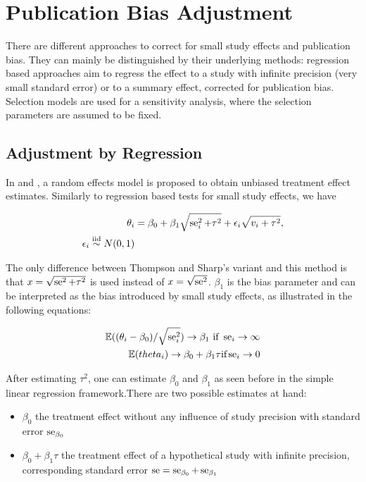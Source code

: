 \documentclass[11pt,a4paper,twoside]{book}\usepackage[]{graphicx}\usepackage[]{color}
\begin{document}
\section{Publication Bias Adjustment}
There are different approaches to correct for small study effects and publication bias. They can mainly be distinguished by their underlying methods: regression based approaches aim to regress the effect to a study with infinite precision (\ie very small standard error) or to a summary effect, corrected for publication bias. Selection models are used for a sensitivity analysis, where the selection parameters are assumed to be fixed. 

\subsection{Adjustment by Regression} \label{sec:regression.adjustment}
In \citet{limitmeta.2} and \citet{limitmeta}, a random effects model is proposed to obtain unbiased treatment effect estimates. Similarly to regression based tests for small study effects, we have

\begin{align}
\theta_i & = \beta_0 + \beta_1\sqrt{\se_i^2 + \tau^2} + \epsilon_i\sqrt{v_i + \tau^2}, \label{eq:limitmeta.regression} \\
\epsilon_i \stackrel{\textrm{iid}}{\sim} N(0,1)
\end{align}

The only difference between Thompson and Sharp's variant and this method is that $x = \sqrt{\operatorname{se}^2 + \tau^2}$ is used instead of $x = \sqrt{\operatorname{se}^2}$. $\beta_{1}$ is the bias parameter and can be interpreted as the bias introduced by small study effects, as illustrated in the following equations:

\begin{align}
\mathbb{E}((\theta_i - \beta_0)/\sqrt{\se_i^2}) \rightarrow \beta_1 \textrm{ if } \se_i \rightarrow \infty \nonumber \\ %
\mathbb{E}(theta_i) \rightarrow \beta_0 + \beta_1 \tau \textrm{if} \se_i \rightarrow 0 \nonumber
\end{align}

After estimating $\tau^2$, one can estimate $\beta_{0}$ and $\beta_{1}$ as seen before in the simple linear regression framework.There are two possible estimates at hand:
\begin{itemize}
\item $\beta_0$ the treatment effect without any influence of study precision with standard error $\operatorname{se}_{\beta_0}$
\item $\beta_0 + \beta_1 \tau$ the treatment effect of a hypothetical study with infinite precision, corresponding standard error $\operatorname{se} = \operatorname{se}_{\beta_0} + \operatorname{se}_{\beta_1}$
\end{itemize}
\end{document}

